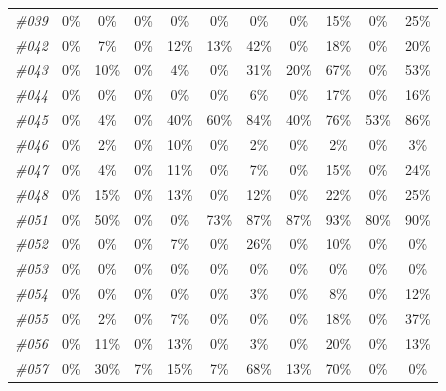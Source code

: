 \begin{table}[t]
\begin{tabular}{ccccccccccc}
      \textit{\#039} & 0\% & 0\% & 0\% & 0\% & 0\% & 0\% & 0\% & 15\% & 0\% & 25\% \\
      \textit{\#042} & 0\% & 7\% & 0\% & 12\% & 13\% & 42\% & 0\% & 18\% & 0\% & 20\% \\
      \textit{\#043} & 0\% & 10\% & 0\% & 4\% & 0\% & 31\% & 20\% & 67\% & 0\% & 53\% \\
      \textit{\#044} & 0\% & 0\% & 0\% & 0\% & 0\% & 6\% & 0\% & 17\% & 0\% & 16\% \\
      \textit{\#045} & 0\% & 4\% & 0\% & 40\% & 60\% & 84\% & 40\% & 76\% & 53\% & 86\% \\
      \textit{\#046} & 0\% & 2\% & 0\% & 10\% & 0\% & 2\% & 0\% & 2\% & 0\% & 3\% \\
      \textit{\#047} & 0\% & 4\% & 0\% & 11\% & 0\% & 7\% & 0\% & 15\% & 0\% & 24\% \\
      \textit{\#048} & 0\% & 15\% & 0\% & 13\% & 0\% & 12\% & 0\% & 22\% & 0\% & 25\% \\
      \textit{\#051} & 0\% & 50\% & 0\% & 0\% & 73\% & 87\% & 87\% & 93\% & 80\% & 90\% \\
      \textit{\#052} & 0\% & 0\% & 0\% & 7\% & 0\% & 26\% & 0\% & 10\% & 0\% & 0\% \\
      \textit{\#053} & 0\% & 0\% & 0\% & 0\% & 0\% & 0\% & 0\% & 0\% & 0\% & 0\% \\
      \textit{\#054} & 0\% & 0\% & 0\% & 0\% & 0\% & 3\% & 0\% & 8\% & 0\% & 12\% \\
      \textit{\#055} & 0\% & 2\% & 0\% & 7\% & 0\% & 0\% & 0\% & 18\% & 0\% & 37\% \\
      \textit{\#056} & 0\% & 11\% & 0\% & 13\% & 0\% & 3\% & 0\% & 20\% & 0\% & 13\% \\
      \textit{\#057} & 0\% & 30\% & 7\% & 15\% & 7\% & 68\% & 13\% & 70\% & 0\% & 0\% \\
    \bottomrule
    \end{tabular}%
  \label{tab:exp_LejuKUAVO_1}%
\end{table}%

